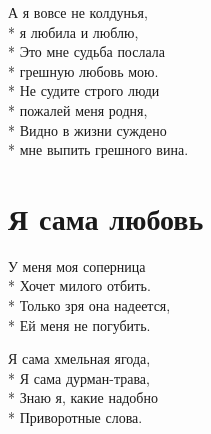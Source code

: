 \medskip

\begin{minipage}{\linewidth}
\hspace*{1.5em}А я вовсе не колдунья,\\*
\hspace*{1.5em}я любила и люблю,\\*
\hspace*{1.5em}Это мне судьба послала\\*
\hspace*{1.5em}грешную любовь мою.\\*
\hspace*{1.5em}Не судите строго люди\\*
\hspace*{1.5em}пожалей меня родня,\\*
\hspace*{1.5em}Видно в жизни суждено\\*
\hspace*{1.5em}мне выпить грешного вина.\\
\end{minipage}

\vspace{\fill}\newpage

\section{Я сама любовь}
\label{song:Я_сама_любовь}

\medskip

\begin{minipage}{\linewidth}
У меня моя соперница\\*
Хочет милого отбить.\\*
Только зря она надеется,\\*
Ей меня не погубить.\\
\end{minipage}\par\medskip\nobreak

\medskip

\begin{minipage}{\linewidth}
Я сама хмельная ягода,\\*
Я сама дурман-трава,\\*
Знаю я, какие надобно\\*
Приворотные слова.\\
\end{minipage}\par\medskip\nobreak

